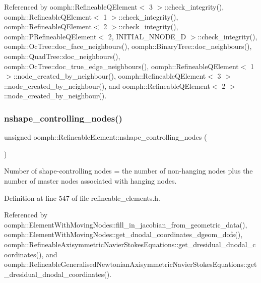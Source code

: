 Referenced by oomph\+::\+Refineable\+Q\+Element$<$ 3 $>$\+::check\+\_\+integrity(), oomph\+::\+Refineable\+Q\+Element$<$ 1 $>$\+::check\+\_\+integrity(), oomph\+::\+Refineable\+Q\+Element$<$ 2 $>$\+::check\+\_\+integrity(), oomph\+::\+P\+Refineable\+Q\+Element$<$ 2, I\+N\+I\+T\+I\+A\+L\+\_\+\+N\+N\+O\+D\+E\+\_\+D $>$\+::check\+\_\+integrity(), oomph\+::\+Oc\+Tree\+::doc\+\_\+face\+\_\+neighbours(), oomph\+::\+Binary\+Tree\+::doc\+\_\+neighbours(), oomph\+::\+Quad\+Tree\+::doc\+\_\+neighbours(), oomph\+::\+Oc\+Tree\+::doc\+\_\+true\+\_\+edge\+\_\+neighbours(), oomph\+::\+Refineable\+Q\+Element$<$ 1 $>$\+::node\+\_\+created\+\_\+by\+\_\+neighbour(), oomph\+::\+Refineable\+Q\+Element$<$ 3 $>$\+::node\+\_\+created\+\_\+by\+\_\+neighbour(), and oomph\+::\+Refineable\+Q\+Element$<$ 2 $>$\+::node\+\_\+created\+\_\+by\+\_\+neighbour().

\mbox{\label{classoomph_1_1RefineableElement_aa3344f0bf971faad9188fd3931979f09}} 
\subsubsection{\texorpdfstring{nshape\+\_\+controlling\+\_\+nodes()}{nshape\_controlling\_nodes()}}
{\footnotesize\ttfamily unsigned oomph\+::\+Refineable\+Element\+::nshape\+\_\+controlling\+\_\+nodes (\begin{DoxyParamCaption}{ }\end{DoxyParamCaption})\hspace{0.3cm}{\ttfamily [inline]}}



Number of shape-\/controlling nodes = the number of non-\/hanging nodes plus the number of master nodes associated with hanging nodes. 



Definition at line 547 of file refineable\+\_\+elements.\+h.



Referenced by oomph\+::\+Element\+With\+Moving\+Nodes\+::fill\+\_\+in\+\_\+jacobian\+\_\+from\+\_\+geometric\+\_\+data(), oomph\+::\+Element\+With\+Moving\+Nodes\+::get\+\_\+dnodal\+\_\+coordinates\+\_\+dgeom\+\_\+dofs(), oomph\+::\+Refineable\+Axisymmetric\+Navier\+Stokes\+Equations\+::get\+\_\+dresidual\+\_\+dnodal\+\_\+coordinates(), and oomph\+::\+Refineable\+Generalised\+Newtonian\+Axisymmetric\+Navier\+Stokes\+Equations\+::get\+\_\+dresidual\+\_\+dnodal\+\_\+coordinates().

